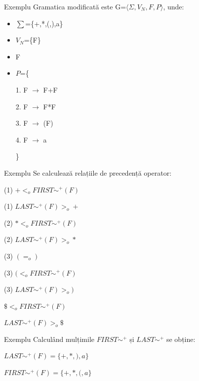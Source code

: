 \documentclass[pdf]{beamer}
\begin{document}
\begin{frame}{Exemplu}
Gramatica modificată este G=$\langle \Sigma, V_N, F, P \rangle$, unde:

\begin{itemize}
\item
$\sum$=\{+,*,(,),a\}
\item
$V_N$=\{F\}
\item
F
\item
$P$=\{

\hspace{1cm} 1. F $\rightarrow$ F+F

\hspace{1cm} 2. F $\rightarrow$ F*F				

\hspace{1cm} 3. F $\rightarrow$ (F)				

\hspace{1cm} 4. F $\rightarrow$ a

\}
\end{itemize}

\end{frame}



\begin{frame}{Exemplu}
Se calculează relațiile de precedență operator:
\newline

(1) $+ <_o FIRST\sim^+(F)$

(1) $LAST\sim^+(F) >_o +$
\newline

(2) $* <_o FIRST\sim^+(F)$

(2) $LAST\sim^+(F) >_o *$
\newline

(3) $( =_o )$

(3) $( <_o FIRST\sim^+(F)$

(3) $LAST\sim^+(F) >_o )$
\newline

$\$ <_o FIRST\sim^+(F)$

$LAST\sim^+(F) >_o \$$
\end{frame}



\begin{frame}{Exemplu}
Calculând mulțimile $FIRST\sim^+$ și $LAST\sim^+$ se obține:
\newline

$LAST\sim^+(F) = \{ +, *, ), a \}$

$FIRST\sim^+(F) = \{ +, *, (, a \}$
\end{frame}
\end{document}
